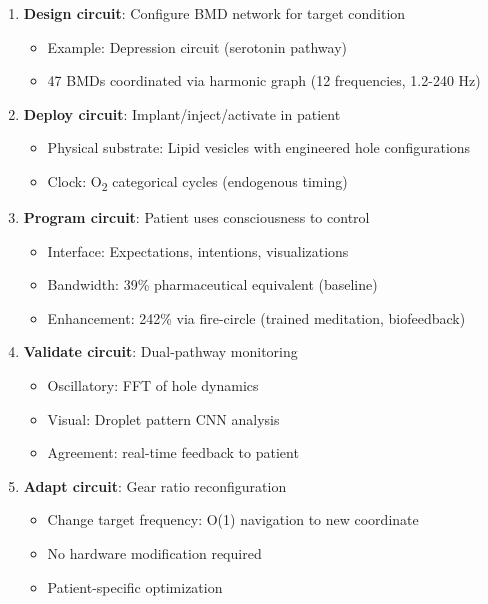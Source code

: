 \documentclass[11pt,a4paper]{article}
\begin{document}
\begin{enumerate}
\item \textbf{Design circuit}: Configure BMD network for target condition
\begin{itemize}
\item Example: Depression circuit (serotonin pathway)
\item 47 BMDs coordinated via harmonic graph (12 frequencies, 1.2-240 Hz)
\end{itemize}

\item \textbf{Deploy circuit}: Implant/inject/activate in patient
\begin{itemize}
\item Physical substrate: Lipid vesicles with engineered hole configurations
\item Clock: O\textsubscript{2} categorical cycles (endogenous timing)
\end{itemize}

\item \textbf{Program circuit}: Patient uses consciousness to control
\begin{itemize}
\item Interface: Expectations, intentions, visualizations
\item Bandwidth: 39\% pharmaceutical equivalent (baseline)
\item Enhancement: 242\% via fire-circle (trained meditation, biofeedback)
\end{itemize}

\item \textbf{Validate circuit}: Dual-pathway monitoring
\begin{itemize}
\item Oscillatory: FFT of hole dynamics
\item Visual: Droplet pattern CNN analysis
\item Agreement: real-time feedback to patient
\end{itemize}

\item \textbf{Adapt circuit}: Gear ratio reconfiguration
\begin{itemize}
\item Change target frequency: O(1) navigation to new coordinate
\item No hardware modification required
\item Patient-specific optimization
\end{itemize}
\end{enumerate}
\end{document}
